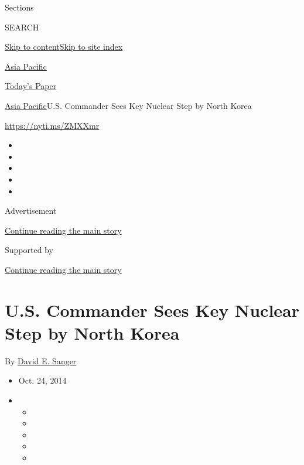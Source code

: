 Sections

SEARCH

\protect\hyperlink{site-content}{Skip to
content}\protect\hyperlink{site-index}{Skip to site index}

\href{https://www.nytimes3xbfgragh.onion/section/world/asia}{Asia
Pacific}

\href{https://myaccount.nytimes3xbfgragh.onion/auth/login?response_type=cookie\&client_id=vi}{}

\href{https://www.nytimes3xbfgragh.onion/section/todayspaper}{Today's
Paper}

\href{/section/world/asia}{Asia Pacific}\textbar{}U.S. Commander Sees
Key Nuclear Step by North Korea

\url{https://nyti.ms/ZMXXmr}

\begin{itemize}
\item
\item
\item
\item
\item
\end{itemize}

Advertisement

\protect\hyperlink{after-top}{Continue reading the main story}

Supported by

\protect\hyperlink{after-sponsor}{Continue reading the main story}

\hypertarget{us-commander-sees-key-nuclear-step-by-north-korea}{%
\section{U.S. Commander Sees Key Nuclear Step by North
Korea}\label{us-commander-sees-key-nuclear-step-by-north-korea}}

By \href{http://www.nytimes3xbfgragh.onion/by/david-e-sanger}{David E.
Sanger}

\begin{itemize}
\item
  Oct. 24, 2014
\item
  \begin{itemize}
  \item
  \item
  \item
  \item
  \item
  \end{itemize}
\end{itemize}

